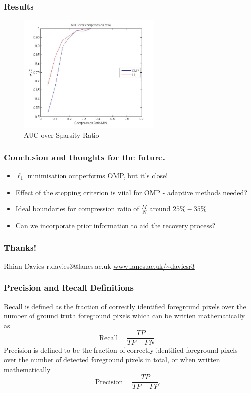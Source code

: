 \documentclass[xcolor=dvipsnames,10pt]{beamer}
\begin{document}
\begin{frame}
  \frametitle{Results}
  \begin{figure}[t]
  \centering
  \includegraphics[width = 7cm]{AUCcompressionRatio}
  \caption{AUC over Sparsity Ratio}
  \label{fig:sr}
\end{figure}
\end{frame}



\begin{frame}
  \frametitle{Conclusion and thoughts for the future.}
  \begin{itemize}
  \item $\ell_1$ minimisation outperforms OMP, but it's close!
\item Effect of the stopping criterion is vital for OMP - adaptive methods needed?
\item Ideal boundaries for compression ratio of $\frac{M}{N}$ around $25 \% - 35 \%$ 
\item Can we incorporate prior information to aid the recovery process?
  \end{itemize}
\end{frame}
      \begin{frame}
        \frametitle{Thanks! }

\Large{
Rhian Davies
\newline
\newline
r.davies3@lancs.ac.uk
\newline
\url{www.lancs.ac.uk/~daviesr3} } 
       \end{frame}

\begin{frame}
  \frametitle{Precision and Recall Definitions}
  Recall is defined as the fraction of correctly identified foreground pixels over the number of ground truth foreground pixels which can be written mathematically as
\begin{equation}
  \label{eq:1}
\text{Recall} = \frac{TP}{TP + FN}. 
\end{equation}
Precision is defined to be the fraction of correctly identified foreground pixels over the number of detected foreground pixels in total, or when written mathematically
\begin{equation}
  \label{eq:2}
\text{Precision} = \frac{TP}{TP + FP}.
\end{equation} 

\end{frame}

 
\end{document}
